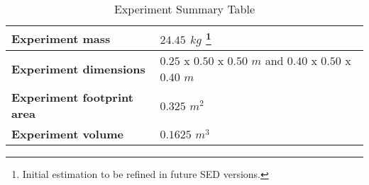 \begin{table}[!ht]
\centering
\begin{tabular}{|l|l|}
\hline
 \textbf{Experiment mass}  & $24.45$ $kg$ \footnote[13]{Initial estimation to be refined in future SED versions.} \\ \hline
 \textbf{Experiment dimensions} & $0.25$ x $0.50$ x $0.50$ $m$ and $0.40$ x $0.50$ x $0.40$ $m$ \\ \hline
 \textbf{Experiment footprint area} & $0.325$ $m^2$ \\ \hline
 \textbf{Experiment volume}  & $0.1625$ $m^3$ \\ \hline
\end{tabular}
\caption{Experiment Summary Table}
\label{dimensions_mass}
\end{table}
\raggedbottom